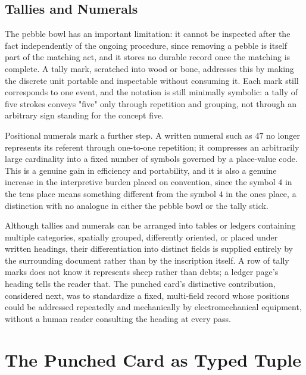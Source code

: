 \documentclass[11pt]{article}
\begin{document}
\subsection{Tallies and Numerals}

The pebble bowl has an important limitation: it cannot be inspected after the fact independently of the ongoing procedure, since removing a pebble is itself part of the matching act, and it stores no durable record once the matching is complete. A tally mark, scratched into wood or bone, addresses this by making the discrete unit portable and inspectable without consuming it. Each mark still corresponds to one event, and the notation is still minimally symbolic: a tally of five strokes conveys "five" only through repetition and grouping, not through an arbitrary sign standing for the concept five.

Positional numerals mark a further step. A written numeral such as $47$ no longer represents its referent through one-to-one repetition; it compresses an arbitrarily large cardinality into a fixed number of symbols governed by a place-value code. This is a genuine gain in efficiency and portability, and it is also a genuine increase in the interpretive burden placed on convention, since the symbol $4$ in the tens place means something different from the symbol $4$ in the ones place, a distinction with no analogue in either the pebble bowl or the tally stick.

Although tallies and numerals can be arranged into tables or ledgers containing multiple categories, spatially grouped, differently oriented, or placed under written headings, their differentiation into distinct fields is supplied entirely by the surrounding document rather than by the inscription itself. A row of tally marks does not know it represents sheep rather than debts; a ledger page's heading tells the reader that. The punched card's distinctive contribution, considered next, was to standardize a fixed, multi-field record whose positions could be addressed repeatedly and mechanically by electromechanical equipment, without a human reader consulting the heading at every pass.

\section{The Punched Card as Typed Tuple}
\end{document}
